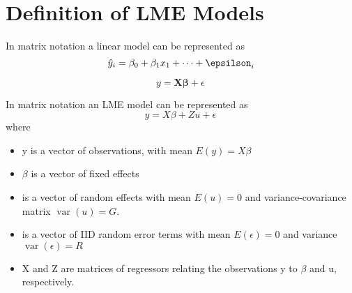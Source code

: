 \section{Definition of LME Models}
In matrix notation a linear model can be represented as
\[ \hat{y}_i = \beta_0 + \beta_1x_1 + \dots + \epsilson_i\]


\[ y = \boldsymbol{X} \boldsymbol{\beta}  + \epsilon\,\]


In matrix notation an LME model can be represented as
\[ y = X \beta + Zu + \epsilon\,\]
where
\begin{itemize}
\item y is a vector of observations, with mean $E(y)=X\beta$
\item $\beta$ is a vector of fixed effects
\item {} is a vector of random effects with mean $E(u)=0$ and variance-covariance matrix 
$\operatorname{var}(u)=G$.
\item \epsilon is a vector of IID random error terms with mean $E(\epsilon)=0$ and variance 
$\operatorname{var}(\epsilon)=R$
\item X and Z are matrices of regressors relating the observations y to $\beta$ and u, respectively.
\end{itemize}


